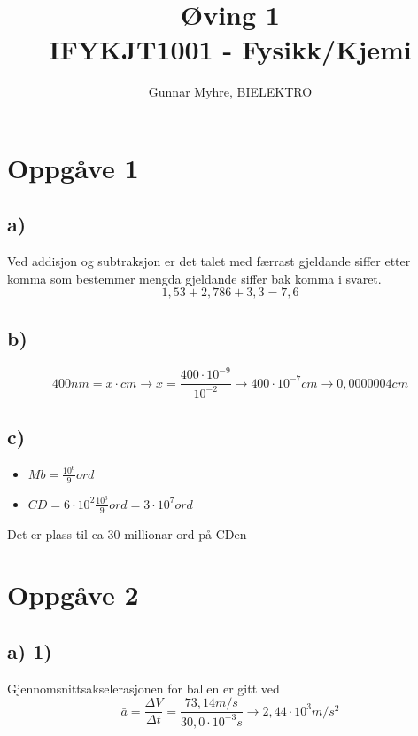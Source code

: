\documentclass[12pt,a4paper]{article}
\title{%
  Øving 1 \\
  \large IFYKJT1001 - Fysikk/Kjemi \\
  }
\author{Gunnar Myhre, BIELEKTRO}
\begin{document}
  \maketitle

  \section*{Oppgåve 1}
    \subsection*{a)}
      Ved addisjon og subtraksjon er det talet med færrast gjeldande siffer 
      etter komma som bestemmer mengda gjeldande siffer bak komma i svaret.
      \begin{equation}
        1,53 + 2,786 + 3,3 = 7,6
      \end{equation}

    \subsection*{b)}
      \begin{equation}
        400 nm = x \cdot cm \rightarrow x = \frac{400 \cdot 10^{-9}}{10^{-2}} 
        \rightarrow 400 \cdot 10^{-7} cm \rightarrow 0,0000004 cm
      \end{equation}

    \subsection*{c)}
      \begin{itemize}
        \item $Mb = \frac{10^6}{9}ord$
        \item $CD = 6\cdot 10^2 \frac{10^6}{9}ord = 3\cdot 10^7 ord$
      \end{itemize}
      Det er plass til ca 30 millionar ord på CDen

  \section*{Oppgåve 2}
    \subsection*{a) 1)}
      Gjennomsnittsakselerasjonen for ballen er gitt ved
      \begin{equation}
        \bar{a} = \frac{\Delta V}{\Delta t} = \frac{73,14 m/s}{30,0\cdot 10^{-3} s}
        \rightarrow 2,44 \cdot 10^3 m/s^2
      \end{equation}
\end{document}
